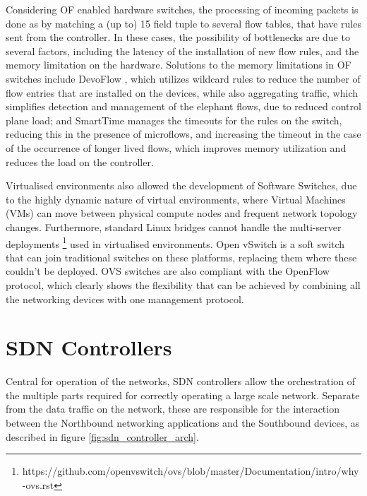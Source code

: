 \begin {enumerate}
\begin {enumerate}
\par Considering OF enabled hardware switches, the processing of incoming packets is done as by matching a (up to) 15 field tuple \cite {CITE - flow_table_management_sdn_switches} to several flow tables, 
that have rules sent from the controller. In these cases, the possibility of bottlenecks are due to several factors, including the latency of the installation of new flow rules, and the memory limitation on the hardware. Solutions 
to the memory limitations in OF switches include DevoFlow \cite {CITE - https://hal.inria.fr/hal-00825087/document}, which utilizes wildcard rules to reduce the number of flow entries that are installed on the devices, while also
aggregating traffic, which simplifies detection and management of the elephant flows, due to reduced control plane load; and SmartTime \cite {CITE - http://rishabhpoddar.com/publications/SmartTime.pdf} manages the timeouts
for the rules on the switch, reducing this in the presence of microflows, and increasing the timeout in the case of the occurrence of longer lived flows, which improves memory utilization and reduces the load on the controller.

\par Virtualised environments also allowed the development of Software Switches, due to the highly dynamic nature of virtual environments, where Virtual Machines (VMs) can move between physical compute nodes and frequent
network topology changes. Furthermore, standard Linux bridges cannot handle the multi-server deployments \footnote {https://github.com/openvswitch/ovs/blob/master/Documentation/intro/why-ovs.rst} used in virtualised environments. 
Open vSwitch is a soft switch that can join traditional switches on these platforms, replacing them where these couldn't be deployed. OVS switches are also compliant with the OpenFlow protocol, which clearly shows the flexibility
that can be achieved by combining all the networking devices with one management protocol. 

\section {SDN Controllers}

Central for operation of the networks, SDN controllers allow the orchestration of the multiple parts required for correctly operating a large scale network. Separate from the data traffic on the network, these are responsible for the interaction
between the Northbound networking applications and the Southbound devices, as described in figure \ref{fig:sdn_controller_arch}. 


\end{enumerate}
\end{enumerate}
